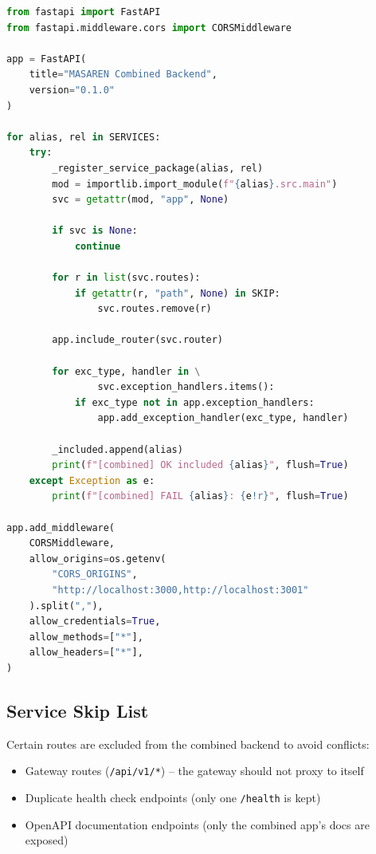 \documentclass[11pt,a4paper]{article}
\begin{document}
\begin{lstlisting}[language=Python, caption=Route Merging]
from fastapi import FastAPI
from fastapi.middleware.cors import CORSMiddleware

app = FastAPI(
    title="MASAREN Combined Backend",
    version="0.1.0"
)

for alias, rel in SERVICES:
    try:
        _register_service_package(alias, rel)
        mod = importlib.import_module(f"{alias}.src.main")
        svc = getattr(mod, "app", None)

        if svc is None:
            continue

        for r in list(svc.routes):
            if getattr(r, "path", None) in SKIP:
                svc.routes.remove(r)

        app.include_router(svc.router)

        for exc_type, handler in \
                svc.exception_handlers.items():
            if exc_type not in app.exception_handlers:
                app.add_exception_handler(exc_type, handler)

        _included.append(alias)
        print(f"[combined] OK included {alias}", flush=True)
    except Exception as e:
        print(f"[combined] FAIL {alias}: {e!r}", flush=True)

app.add_middleware(
    CORSMiddleware,
    allow_origins=os.getenv(
        "CORS_ORIGINS",
        "http://localhost:3000,http://localhost:3001"
    ).split(","),
    allow_credentials=True,
    allow_methods=["*"],
    allow_headers=["*"],
)
\end{lstlisting}

\subsection{Service Skip List}

Certain routes are excluded from the combined backend to avoid conflicts:
\begin{itemize}
  \item Gateway routes (\texttt{/api/v1/*}) -- the gateway should not proxy to itself
  \item Duplicate health check endpoints (only one \texttt{/health} is kept)
  \item OpenAPI documentation endpoints (only the combined app's docs are exposed)
\end{itemize}

\clearpage

\end{document}
